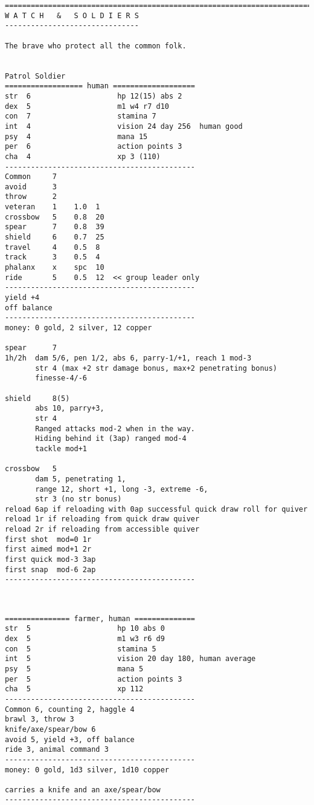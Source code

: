\goodbreak \begin{samepage} \small \begin{verbatim}
================================================================================
W A T C H   &   S O L D I E R S
-------------------------------

The brave who protect all the common folk.


Patrol Soldier
================== human ===================
str  6                    hp 12(15) abs 2
dex  5                    m1 w4 r7 d10
con  7                    stamina 7
int  4                    vision 24 day 256  human good
psy  4                    mana 15
per  6                    action points 3
cha  4                    xp 3 (110)
--------------------------------------------
Common     7
avoid      3
throw      2
veteran    1    1.0  1
crossbow   5    0.8  20
spear      7    0.8  39
shield     6    0.7  25
travel     4    0.5  8
track      3    0.5  4
phalanx    x    spc  10
ride       5    0.5  12  << group leader only
--------------------------------------------
yield +4
off balance
--------------------------------------------
money: 0 gold, 2 silver, 12 copper

spear      7
1h/2h  dam 5/6, pen 1/2, abs 6, parry-1/+1, reach 1 mod-3
       str 4 (max +2 str damage bonus, max+2 penetrating bonus)
       finesse-4/-6

shield     8(5)
       abs 10, parry+3,
       str 4
       Ranged attacks mod-2 when in the way.
       Hiding behind it (3ap) ranged mod-4
       tackle mod+1

crossbow   5
       dam 5, penetrating 1,
       range 12, short +1, long -3, extreme -6,
       str 3 (no str bonus)
reload 6ap if reloading with 0ap successful quick draw roll for quiver
reload 1r if reloading from quick draw quiver
reload 2r if reloading from accessible quiver
first shot  mod=0 1r
first aimed mod+1 2r
first quick mod-3 3ap
first snap  mod-6 2ap
--------------------------------------------
\end{verbatim} \normalsize \end{samepage}

\

\goodbreak \begin{samepage} \small \begin{verbatim}
=============== farmer, human ==============
str  5                    hp 10 abs 0
dex  5                    m1 w3 r6 d9
con  5                    stamina 5
int  5                    vision 20 day 180, human average
psy  5                    mana 5
per  5                    action points 3
cha  5                    xp 112
--------------------------------------------
Common 6, counting 2, haggle 4
brawl 3, throw 3
knife/axe/spear/bow 6
avoid 5, yield +3, off balance
ride 3, animal command 3
--------------------------------------------
money: 0 gold, 1d3 silver, 1d10 copper

carries a knife and an axe/spear/bow
--------------------------------------------
\end{verbatim} \normalsize \end{samepage}

